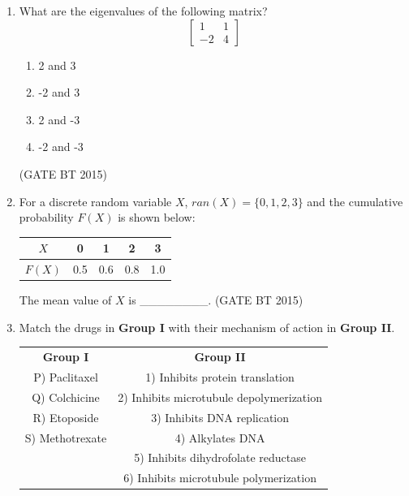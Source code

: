 \documentclass[journal,12pt,onecolumn]{IEEEtran}
\begin{document}
\begin{enumerate}[label=\textbf{Q.\arabic*}]
\item What are the eigenvalues of the following matrix?
\[
\begin{bmatrix}
1 & 1 \\
-2 & 4
\end{bmatrix}
\]

\begin{multicols}{4}
\begin{enumerate}
    \item 2 and 3
    \item -2 and 3
    \item 2 and -3
    \item -2 and -3
\end{enumerate}
\end{multicols}\hfill (GATE BT 2015)

\item For a discrete random variable $X$, $ran(X)=\{0,1,2,3\}$ and the cumulative probability $F(X)$ is shown below:

\begin{table}[H]
\centering
\begin{tabular}{|c|c|c|c|c|}
\hline
$X$ & 0 & 1 & 2 & 3 \\
\hline
$F(X)$ & 0.5 & 0.6 & 0.8 & 1.0 \\
\hline
\end{tabular}
\end{table}

The mean value of $X$ is \_\_\_\_\_\_\_\_.
\hfill (GATE BT 2015)



\item Match the drugs in \textbf{Group I} with their mechanism of action in \textbf{Group II}.

\begin{table}[H]
\begin{tabular}{cc}
\textbf{Group I} & \textbf{Group II}  \\
P)  Paclitaxel      & 1)  Inhibits protein translation \\
Q)  Colchicine      & 2) Inhibits microtubule depolymerization \\
R)  Etoposide       & 3)  Inhibits DNA replication \\
S)  Methotrexate    & 4)  Alkylates DNA \\
              & 5) Inhibits dihydrofolate reductase \\
               & 6)  Inhibits microtubule polymerization \\


\end{tabular}
\end{table}
\end{enumerate}
\end{document}
